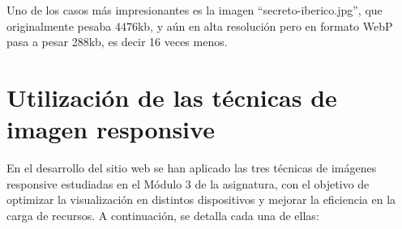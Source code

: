 \documentclass{article}
\begin{document}
Uno de los casos más impresionantes es la imagen ``secreto-iberico.jpg'', que originalmente pesaba 4476kb, y aún en alta resolución pero en formato WebP pasa a pesar 288kb, es decir 16 veces menos.

\section{Utilización de las técnicas de imagen responsive}\label{sec:utilizacion-de-las-tecnicas-de-imagen-responsive}

En el desarrollo del sitio web se han aplicado las tres técnicas de imágenes responsive estudiadas en el Módulo 3 de la asignatura, con el objetivo de optimizar la visualización en distintos dispositivos y mejorar la eficiencia en la carga de recursos. A continuación, se detalla cada una de ellas:
\end{document}
